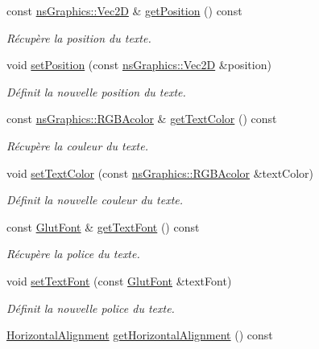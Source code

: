 \begin{DoxyCompactItemize}
const \hyperlink{classns_graphics_1_1_vec2_d}{ns\+Graphics\+::\+Vec2D} \& \hyperlink{classns_gui_1_1_text_a1e06796a15191e7682eb4abd0ecc515e}{get\+Position} () const
\begin{DoxyCompactList}\small\item\em Récupère la position du texte. \end{DoxyCompactList}\item 
void \hyperlink{classns_gui_1_1_text_ae258c9cd1203c3e52b7728e0211e9daa}{set\+Position} (const \hyperlink{classns_graphics_1_1_vec2_d}{ns\+Graphics\+::\+Vec2D} \&position)
\begin{DoxyCompactList}\small\item\em Définit la nouvelle position du texte. \end{DoxyCompactList}\item 
const \hyperlink{classns_graphics_1_1_r_g_b_acolor}{ns\+Graphics\+::\+R\+G\+B\+Acolor} \& \hyperlink{classns_gui_1_1_text_a248f06b3a9a85c05225449424311abd0}{get\+Text\+Color} () const
\begin{DoxyCompactList}\small\item\em Récupère la couleur du texte. \end{DoxyCompactList}\item 
void \hyperlink{classns_gui_1_1_text_a9e10bb21647ce95f034a4205562e222a}{set\+Text\+Color} (const \hyperlink{classns_graphics_1_1_r_g_b_acolor}{ns\+Graphics\+::\+R\+G\+B\+Acolor} \&text\+Color)
\begin{DoxyCompactList}\small\item\em Définit la nouvelle couleur du texte. \end{DoxyCompactList}\item 
const \hyperlink{classns_gui_1_1_glut_font}{Glut\+Font} \& \hyperlink{classns_gui_1_1_text_af578710341d0afb6c593550cbc94ca64}{get\+Text\+Font} () const
\begin{DoxyCompactList}\small\item\em Récupère la police du texte. \end{DoxyCompactList}\item 
void \hyperlink{classns_gui_1_1_text_afa19265ff44bdab288fa2a7100dd9c50}{set\+Text\+Font} (const \hyperlink{classns_gui_1_1_glut_font}{Glut\+Font} \&text\+Font)
\begin{DoxyCompactList}\small\item\em Définit la nouvelle police du texte. \end{DoxyCompactList}\item 
\hyperlink{classns_gui_1_1_text_a78bb37c174a4f37eec2b7d69459ee7dc}{Horizontal\+Alignment} \hyperlink{classns_gui_1_1_text_a2e3468bf7a3b43e5e87a68ed7876dcfe}{get\+Horizontal\+Alignment} () const

\end{DoxyCompactItemize}
